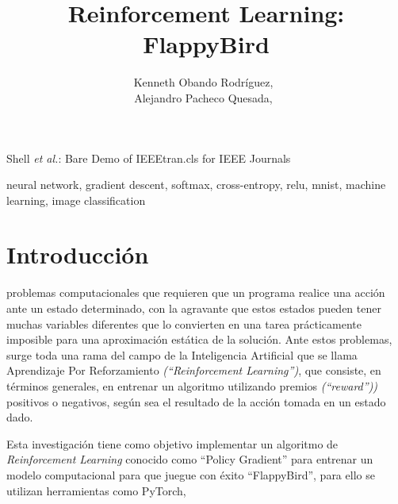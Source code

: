 \documentclass[journal]{IEEEtran}
\begin{document}
    \title{Reinforcement Learning:\\ FlappyBird}

    \author{Kenneth Obando Rodríguez,~\\
                Alejandro Pacheco Quesada,~}

        {Shell \MakeLowercase{\textit{et al.}}: Bare Demo of IEEEtran.cls for IEEE Journals}

    \maketitle

    
\begin{abstract}

\end{abstract}

\begin{IEEEkeywords}
neural network, gradient descent, softmax, cross-entropy, relu, mnist, machine learning, image classification
\end{IEEEkeywords}

\IEEEpeerreviewmaketitle


\section{Introducción}
 problemas computacionales que requieren que un programa realice una acción ante un estado determinado, con la agravante que estos estados pueden tener muchas variables diferentes que lo convierten en una tarea prácticamente imposible para una aproximación estática de la solución. Ante estos problemas, surge toda una rama del campo de la Inteligencia Artificial que se llama Aprendizaje Por Reforzamiento \emph{(``Reinforcement Learning'')}, que consiste, en términos generales, en entrenar un algoritmo utilizando premios \emph{(``reward''))} positivos o negativos, según sea el resultado de la acción tomada en un estado dado.

Esta investigación tiene como objetivo implementar un algoritmo de \emph{Reinforcement Learning} conocido como ``Policy Gradient'' para entrenar un modelo computacional para que juegue con éxito ``FlappyBird'', para ello se utilizan herramientas como PyTorch, 
\end{document}
